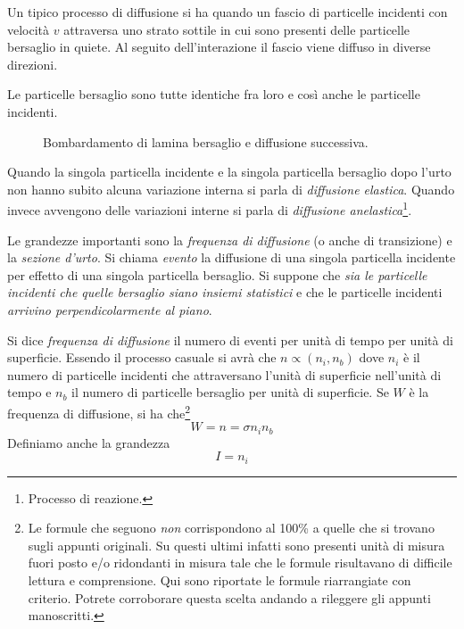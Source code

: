 Un tipico processo di diffusione si ha quando un fascio di particelle incidenti
con velocità $v$ attraversa uno strato sottile in cui sono presenti delle
particelle bersaglio in quiete. Al seguito dell'interazione il fascio viene
diffuso in diverse direzioni.

Le particelle bersaglio sono tutte identiche fra loro e così anche le particelle incidenti.
\begin{figure}
  \caption{Bombardamento di lamina bersaglio e diffusione successiva.}
  \label{fig:diffusione}
  
\end{figure}
Quando la singola particella incidente e la singola particella bersaglio dopo l'urto non hanno subito alcuna variazione interna si parla di \textit{diffusione elastica}. Quando invece avvengono delle variazioni interne si parla di \textit{diffusione anelastica}\footnote{Processo di reazione. }.

Le grandezze importanti sono la \textit{frequenza di diffusione} (o anche di transizione) e la \textit{sezione d'urto}. Si chiama \textit{evento} la diffusione di una singola particella incidente per effetto di una singola particella bersaglio. Si suppone che \textit{sia le particelle incidenti che quelle bersaglio siano insiemi statistici} e che le particelle incidenti \textit{arrivino perpendicolarmente al piano}.

Si dice \textit{frequenza di diffusione} il numero di eventi per unità di tempo per unità di superficie. Essendo il processo casuale si avrà che $n\propto (n_i, n_b)$ dove $n_i$ è il numero di particelle incidenti che attraversano l'unità di superficie nell'unità di tempo e $n_b$ il numero di particelle bersaglio per unità di superficie. Se $W$ è la frequenza di diffusione, si ha che\footnote{Le formule che seguono \textit{non} corrispondono al 100\% a quelle che si trovano sugli appunti originali. Su questi ultimi infatti sono presenti unità di misura fuori posto e/o ridondanti in misura tale che le formule risultavano di difficile lettura e comprensione. Qui sono riportate le formule riarrangiate con criterio. Potrete corroborare questa scelta andando a rileggere gli appunti manoscritti.}
\begin{equation}
 W = n = \sigma n_in_b
\end{equation}
Definiamo anche la grandezza
\begin{equation}
 I = n_i
\end{equation}

